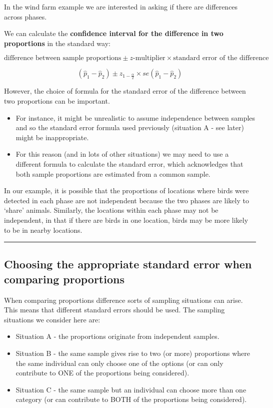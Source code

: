 \documentclass[
  oneside]{krantz}
\begin{document}
In the wind farm example we are interested in asking if there are differences across phases.

We can calculate the \textbf{confidence interval for the difference in two proportions} in the standard way:

\[\textrm{difference between sample proportions} \pm z\textrm{-multiplier} \times \textrm{standard error of the difference}\]

\[(\hat p_1-\hat p_2) \pm z_{1-\frac{\alpha}{2}} \times se(\hat p_1-\hat p_2)\]

However, the choice of formula for the standard error of the difference between two proportions can be important.

\begin{itemize}
\item
  For instance, it might be unrealistic to assume independence between samples and so the standard error formula used previously (situation A - see later) might be inappropriate.
\item
  For this reason (and in lots of other situations) we may need to use a different formula to calculate the standard error, which acknowledges that both sample proportions are estimated from a common sample.
\end{itemize}

In our example, it is possible that the proportions of locations where birds were detected in each phase are not independent because the two phases are likely to `share' animals. Similarly, the locations within each phase may not be independent, in that if there are birds in one location, birds may be more likely to be in nearby locations.

\begin{center}\rule{0.5\linewidth}{0.5pt}\end{center}

\hypertarget{choosing-the-appropriate-standard-error-when-comparing-proportions}{%
\subsection{Choosing the appropriate standard error when comparing proportions}\label{choosing-the-appropriate-standard-error-when-comparing-proportions}}

When comparing proportions difference sorts of sampling situations can arise. This means that different standard errors should be used. The sampling situations we consider here are:

\begin{itemize}
\item
  Situation A - the proportions originate from independent samples.
\item
  Situation B - the same sample gives rise to two (or more) proportions where the same individual can only choose one of the options (or can only contribute to ONE of the proportions being considered).
\item
  Situation C - the same sample but an individual can choose more than one category (or can contribute to BOTH of the proportions being considered).
\end{itemize}
\end{document}
